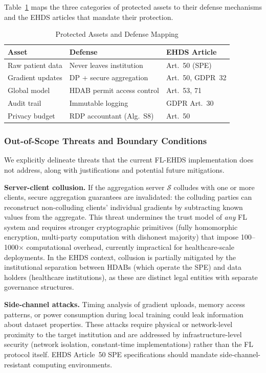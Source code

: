 \documentclass[conference]{IEEEtran}
\begin{document}
Table~\ref{tab:protected_assets} maps the three categories of protected assets to their defense mechanisms and the EHDS articles that mandate their protection.

\begin{table}[htbp]
\centering
\caption{Protected Assets and Defense Mapping}
\label{tab:protected_assets}
\small
\begin{tabular}{p{2cm}p{2.8cm}p{2cm}}
\toprule
\textbf{Asset} & \textbf{Defense} & \textbf{EHDS Article} \\
\midrule
Raw patient data & Never leaves institution & Art.~50 (SPE) \\
Gradient updates & DP + secure aggregation & Art.~50, GDPR~32 \\
Global model & HDAB permit access control & Art.~53, 71 \\
Audit trail & Immutable logging & GDPR Art.~30 \\
Privacy budget & RDP accountant (Alg.~S8) & Art.~50 \\
\bottomrule
\end{tabular}
\end{table}

\subsubsection{Out-of-Scope Threats and Boundary Conditions}

We explicitly delineate threats that the current FL-EHDS implementation does not address, along with justifications and potential future mitigations.

\textbf{Server-client collusion.} If the aggregation server $\mathcal{S}$ colludes with one or more clients, secure aggregation guarantees are invalidated: the colluding parties can reconstruct non-colluding clients' individual gradients by subtracting known values from the aggregate. This threat undermines the trust model of \textit{any} FL system and requires stronger cryptographic primitives (fully homomorphic encryption, multi-party computation with dishonest majority) that impose 100--1000$\times$ computational overhead, currently impractical for healthcare-scale deployments. In the EHDS context, collusion is partially mitigated by the institutional separation between HDABs (which operate the SPE) and data holders (healthcare institutions), as these are distinct legal entities with separate governance structures.

\textbf{Side-channel attacks.} Timing analysis of gradient uploads, memory access patterns, or power consumption during local training could leak information about dataset properties. These attacks require physical or network-level proximity to the target institution and are addressed by infrastructure-level security (network isolation, constant-time implementations) rather than the FL protocol itself. EHDS Article~50 SPE specifications should mandate side-channel-resistant computing environments.
\end{document}

